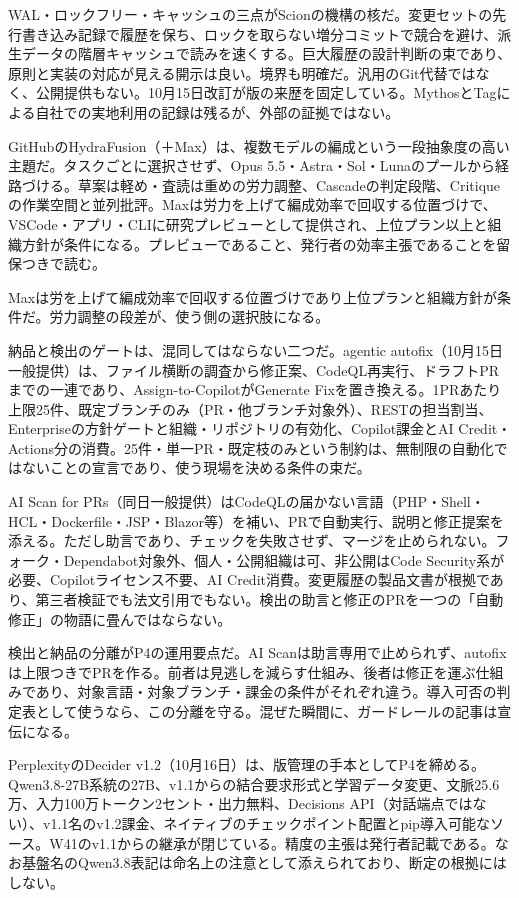 \documentclass[lualatex,a4paper,10pt]{jlreq}
\begin{document}
WAL・ロックフリー・キャッシュの三点がScionの機構の核だ。変更セットの先行書き込み記録で履歴を保ち、ロックを取らない増分コミットで競合を避け、派生データの階層キャッシュで読みを速くする。巨大履歴の設計判断の束であり、原則と実装の対応が見える開示は良い。境界も明確だ。汎用のGit代替ではなく、公開提供もない。10月15日改訂が版の来歴を固定している。MythosとTagによる自社での実地利用の記録は残るが、外部の証拠ではない。
\cite{B32}


GitHubのHydraFusion（＋Max）は、複数モデルの編成という一段抽象度の高い主題だ。タスクごとに選択させず、Opus 5.5・Astra・Sol・Lunaのプールから経路づける。草案は軽め・査読は重めの労力調整、Cascadeの判定段階、Critiqueの作業空間と並列批評。Maxは労力を上げて編成効率で回収する位置づけで、VSCode・アプリ・CLIに研究プレビューとして提供され、上位プラン以上と組織方針が条件になる。プレビューであること、発行者の効率主張であることを留保つきで読む。
\cite{B33}


Maxは労を上げて編成効率で回収する位置づけであり上位プランと組織方針が条件だ。労力調整の段差が、使う側の選択肢になる。
\cite{B33}


納品と検出のゲートは、混同してはならない二つだ。agentic autofix（10月15日一般提供）は、ファイル横断の調査から修正案、CodeQL再実行、ドラフトPRまでの一連であり、Assign-to-CopilotがGenerate Fixを置き換える。1PRあたり上限25件、既定ブランチのみ（PR・他ブランチ対象外）、RESTの担当割当、Enterpriseの方針ゲートと組織・リポジトリの有効化、Copilot課金とAI Credit・Actions分の消費。25件・単一PR・既定枝のみという制約は、無制限の自動化ではないことの宣言であり、使う現場を決める条件の束だ。
\cite{B34}


AI Scan for PRs（同日一般提供）はCodeQLの届かない言語（PHP・Shell・HCL・Dockerfile・JSP・Blazor等）を補い、PRで自動実行、説明と修正提案を添える。ただし助言であり、チェックを失敗させず、マージを止められない。フォーク・Dependabot対象外、個人・公開組織は可、非公開はCode Security系が必要、Copilotライセンス不要、AI Credit消費。変更履歴の製品文書が根拠であり、第三者検証でも法文引用でもない。検出の助言と修正のPRを一つの「自動修正」の物語に畳んではならない。
\cite{B35}


検出と納品の分離がP4の運用要点だ。AI Scanは助言専用で止められず、autofixは上限つきでPRを作る。前者は見逃しを減らす仕組み、後者は修正を運ぶ仕組みであり、対象言語・対象ブランチ・課金の条件がそれぞれ違う。導入可否の判定表として使うなら、この分離を守る。混ぜた瞬間に、ガードレールの記事は宣伝になる。
\cite{B34,B35}


PerplexityのDecider v1.2（10月16日）は、版管理の手本としてP4を締める。Qwen3.8-27B系統の27B、v1.1からの結合要求形式と学習データ変更、文脈25.6万、入力100万トークン2セント・出力無料、Decisions API（対話端点ではない）、v1.1名のv1.2課金、ネイティブのチェックポイント配置とpip導入可能なソース。W41のv1.1からの継承が閉じている。精度の主張は発行者記載である。なお基盤名のQwen3.8表記は命名上の注意として添えられており、断定の根拠にはしない。
\cite{B36,B37,B38}
\end{document}
